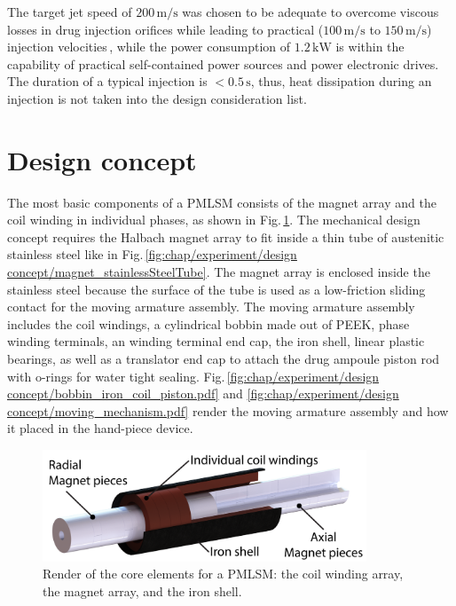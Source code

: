     
    The target jet speed of $200\,\mathrm{m/s}$ was chosen to be adequate to overcome viscous losses in drug injection orifices while leading to practical ($100\,\mathrm{m/s}$ to $150\,\mathrm{m/s}$) injection velocities\,\cite{mitragotri2006}, while the power consumption of $1.2\,\mathrm{kW}$ is within the capability of practical self-contained power sources and power electronic drives. The duration of a typical injection is $<0.5\,\mathrm{s}$, thus, heat dissipation during an injection is not taken into the design consideration list.
    

\section{Design concept}                              \label{Chapter:experiment/design concept}

    
    
    The most basic components of a \acs{PMLSM} consists of the magnet array and the coil winding in individual phases, as shown in Fig.\,\ref{fig:chap/experiment/design concept/magnet_coil_iron}. The mechanical design concept requires the Halbach magnet array to fit inside a thin tube of austenitic stainless steel like in Fig.\,\ref{fig:chap/experiment/design concept/magnet_stainlessSteelTube}. The magnet array is enclosed inside the stainless steel because the surface of the tube is used as a low-friction sliding contact for the moving armature assembly. The moving armature assembly includes the coil windings, a cylindrical bobbin made out of PEEK, phase winding terminals, an winding terminal end cap, the iron shell, linear plastic bearings, as well as a translator end cap to attach the drug ampoule piston rod with o-rings for water tight sealing.  Fig.\,\ref{fig:chap/experiment/design concept/bobbin_iron_coil_piston.pdf} and \ref{fig:chap/experiment/design concept/moving_mechanism.pdf} render the moving armature assembly and how it placed in the hand-piece device. 
    
    \begin{figure}[h]
        \centering
        \includegraphics[width=3.8in]{chap5/images_concept/magnet_coil_iron.pdf}
        \caption{Render of the core elements for a PMLSM: the coil winding array, the magnet array, and the iron shell.}
        \label{fig:chap/experiment/design concept/magnet_coil_iron}
    \end{figure}
    

